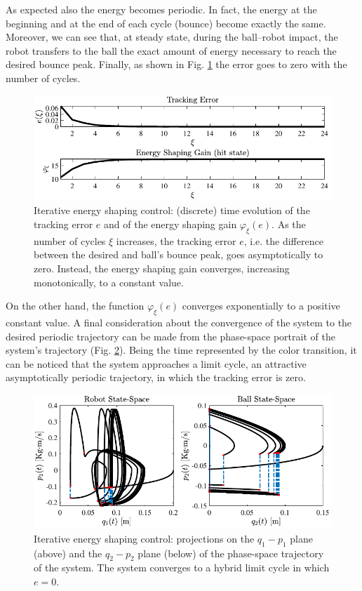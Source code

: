 %
As expected also the energy becomes periodic. In fact, the energy at the beginning and at the end of each cycle (bounce) become exactly the same. Moreover, we can see that, at steady state, during the ball--robot impact, the robot transfers to the ball the exact amount of energy necessary to reach the desired bounce peak. Finally, as shown in Fig. \ref{fig:ctrl5} the error goes to zero with the number of cycles.
%
\begin{figure}[!ht]
	\centering
	\includegraphics[width=\linewidth]{Figures/ctrl5.pdf}
	\caption{Iterative energy shaping control: (discrete) time evolution of the tracking error $e$ and of the energy shaping gain $\varphi_\xi(e)$. As the number of cycles $\xi$ increases, the tracking error $e$, i.e. the difference between the desired and ball's bounce peak, goes asymptotically to zero. Instead, the energy shaping gain converges, increasing monotonically, to a constant value.}
	\label{fig:ctrl5}
\end{figure}
%
On the other hand, the function $\varphi_\xi(e)$ converges exponentially to a positive constant value. 
%
A final consideration about the convergence of the system to the desired periodic trajectory can be made from the phase-space portrait of the system's trajectory (Fig. \ref{fig:ctrl2}). Being the time represented by the color transition, it can be noticed that the system approaches a limit cycle, an attractive asymptotically periodic trajectory, in which the tracking error is zero.
%
%
\begin{figure}[!ht]
	\centering
	\includegraphics[width=\linewidth]{Figures/ctrl2.pdf}
	\caption[Iterative energy shaping control: phase--space trajectories]{Iterative energy shaping control: projections on the $q_1-p_1$ plane (above) and the $q_2-p_2$ plane (below) of the phase-space trajectory of the system. The system converges to a hybrid limit cycle in which $e=0$.}
	\label{fig:ctrl2}
\end{figure}
%
\clearpage
%
